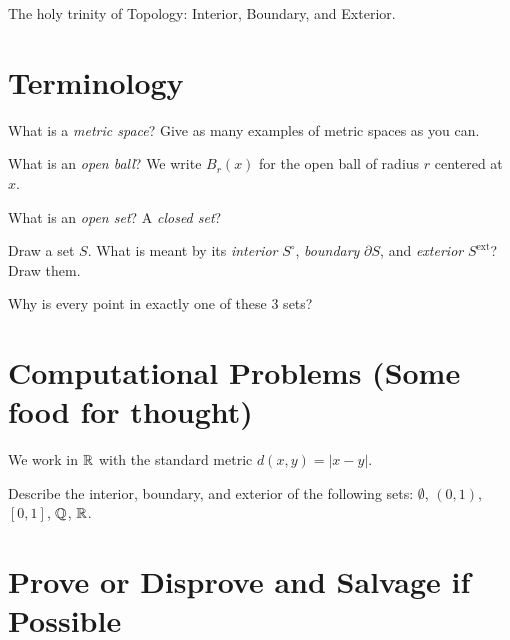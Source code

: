 \documentclass{homework}
\author{Names of Contributors}
\begin{document}
\maketitle

\begin{inspiration}
  The holy trinity of Topology: Interior, Boundary, and Exterior.
\end{inspiration}

\section{Terminology}

\begin{problem}
  What is a \textit{metric space}? Give as many examples of metric spaces as you can.
\end{problem}

\begin{problem}
  What is an \textit{open ball}? We write $B_r(x)$ for the open ball of radius $r$ centered at $x$.
\end{problem}

\begin{problem}
   What is an \textit{open set}? A \textit{closed set}?
\end{problem}

\begin{problem}
  Draw a set $S$. What is meant by its \textit{interior} $S^\circ$, \textit{boundary} $\partial S$, and \textit{exterior} $S^{\text{ext}}$? Draw them.

  Why is every point in exactly one of these 3 sets?
\end{problem}

\section{Computational Problems (Some food for thought)}

\begin{problem}
  We work in $\mathbb{R}$ with the standard metric $d(x,y)=|x-y|$.
  
  Describe the interior, boundary, and exterior of the following sets: $\emptyset$, $(0,1)$, $[0,1]$, $\mathbb{Q}$, $\mathbb{R}$.
\end{problem}

\section{Prove or Disprove and Salvage if Possible}
\end{document}
